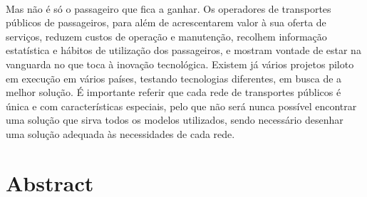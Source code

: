 \\Mas não é só o passageiro que fica a ganhar. Os operadores de transportes públicos de passageiros, para além de acrescentarem valor à sua oferta de serviços, reduzem custos de operação e manutenção, recolhem informação estatística e hábitos de utilização dos passageiros, e mostram vontade de estar na vanguarda no que toca à inovação tecnológica. Existem já vários projetos piloto em execução em vários países, testando tecnologias diferentes, em busca de a melhor solução. É importante referir que cada rede de transportes públicos é única e com características especiais, pelo que não será nunca possível encontrar uma solução que sirva todos os modelos utilizados, sendo necessário desenhar uma solução adequada às necessidades de cada rede.

\chapter*{Abstract}

